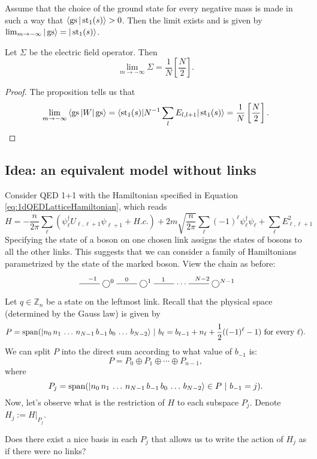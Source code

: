 \begin{proposition}
Assume that the choice of the ground state for every negative mass is made in such a way that $\langle \operatorname{gs} | \operatorname{st}_1(s)\rangle > 0$. Then the limit exists and is given by $\lim_{m \rightarrow -\infty} |\operatorname{gs}\rangle = |\operatorname{st}_1(s)\rangle$.
\end{proposition}
\begin{corp}
Let $\Sigma$ be the electric field operator. Then
\[
\lim_{m \rightarrow -\infty} \Sigma = \frac{1}{N}\left[\frac{N}{2}\right].
\]
\end{corp}
\begin{proof}
The proposition tells us that
\[
\lim_{m \rightarrow -\infty} \left\langle \operatorname{gs} |W|\operatorname{gs} \right\rangle = \langle \operatorname{st}_1(s) |N^{-1}\sum_l E_{l,l+1} | \operatorname{st}_1(s)\rangle = \frac{1}{N}\left[\frac{N}{2}\right].\qedhere
\]
\end{proof}
	
	\subsection{Idea: an equivalent model without links}
	Consider QED 1+1 with the Hamiltonian specified in Equation \ref{eq:1dQEDLatticeHamiltonian}, which reads 
\[
	H=-\frac{n}{2\pi} \sum_\ell (\psi_\ell^\dagger U_{\ell,\ell+1}\psi_{\ell+1}+H.c.) + 2m\sqrt{\frac{n}{2\pi}}\sum_\ell (-1)^\ell \psi_\ell^\dagger\psi_\ell+  \sum_{\ell} E_{\ell,\ell+1}^2
\]
Specifying the state of a boson on one chosen link assigns the states of bosons to all the other links. This suggests that we can consider a family of Hamiltonians parametrized by the state of the marked boson. View the chain as before:
	\[
	\xymatrix{
	\ar@{-}[r]^{-1} & \bigcirc^0 \ar@{-}[r]^{0} &  \bigcirc^1 \ar@{-}[r]^{1} & \cdots & \ar@{-}[l]_{N-2} \bigcirc^{N-1}
	}
	\]
	Let $q \in \mathbb Z_n$ be a state on the leftmost link. Recall that the physical space (determined by the Gauss law) is given by
	\[
	P = \operatorname{span} ( |n_0\, n_1\, \ldots \, n_{N-1} \, b_{-1}\, b_0\, \ldots\, b_{N-2}\rangle \ | \ b_{\ell} =b_{\ell-1} + n_{\ell} + \frac{1}{2}((-1)^\ell-1) \ \text{for every} \ \ell).
	\]
	We can split $P$ into the direct sum according to what value of $b_{-1}$ is:
	\[
	P = P_0 \oplus P_1 \oplus \cdots \oplus P_{n-1},
	\]
	where
	\[
	P_j = \operatorname{span}( |n_0\, n_1\, \ldots \, n_{N-1} \, b_{-1}\, b_0\, \ldots\, b_{N-2}\rangle \in P \ | \ b_{-1} = j).
	\]
	Now, let's observe what is the restriction of $H$ to each subspace $P_j$. Denote $H_j := H|_{P_j}$.
\begin{idea}
Does there exist a nice basis in each $P_j$ that allows us to write the action of $H_j$ as if there were no links?
\end{idea}

